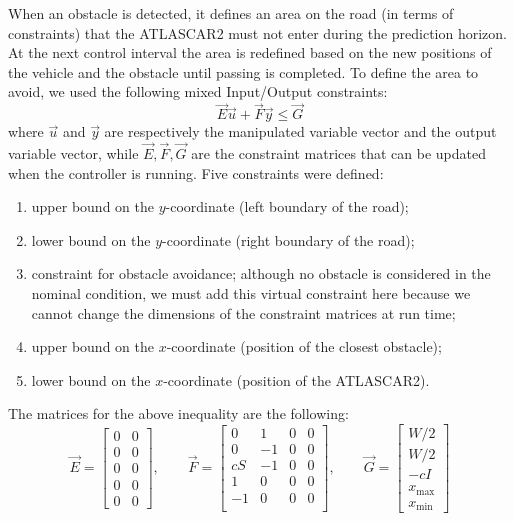 When an obstacle is detected, it defines an area on the road (in terms of constraints) that the ATLASCAR2 must not enter during the prediction horizon. At the next control interval the area is redefined based on the new positions of the vehicle and the obstacle until passing is completed.
To define the area to avoid, we used the following mixed Input/Output constraints:
\begin{equation}
\label{eqn:mixed_IO_constraints}
\vec{E}\vec{u}+\vec{F}\vec{y}\leq \vec{G}
\end{equation}
where $\vec{u}$ and $\vec{y}$ are respectively the manipulated variable vector and the output variable vector, while $\vec{E},\vec{F},\vec{G}$ are the constraint matrices that can be updated when the controller is running. Five constraints were defined:
\begin{enumerate}
	\item upper bound on the $y$-coordinate (left boundary of the road);
	\item lower bound on the $y$-coordinate (right boundary of the road);
	\item constraint for obstacle avoidance; although no obstacle is considered in the nominal condition, we must add this virtual constraint here because we cannot change the dimensions of the constraint matrices at run time;
	\item upper bound on the $x$-coordinate (position of the closest obstacle);
	\item lower bound on the $x$-coordinate (position of the ATLASCAR2).
\end{enumerate}
The matrices for the above inequality are the following:
\begin{equation}
\vec{E}= 
\begin{bmatrix}
0&0\\
0&0\\
0&0\\
0&0\\
0&0
\end{bmatrix},
\qquad
\vec{F}=\begin{bmatrix}
0&1&0&0\\
0&-1&0&0\\
cS&-1&0&0\\
1&0&0&0\\
-1&0&0&0\\
\end{bmatrix},
\qquad
\vec{G}=
\begin{bmatrix}
W/2\\W/2\\-cI\\x_{\max}\\x_{\min}
\end{bmatrix}
\end{equation}


